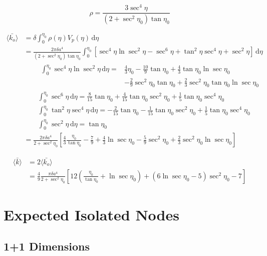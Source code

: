 \documentclass[12pt]{article}
\begin{document}
\begin{equation}
\rho = \frac{3\sec^4\eta}{\left(2+\sec^2\eta_0\right)\tan\eta_0}
\end{equation}

\begin{align}
\langle\bar{k_o}\rangle &= \delta\int_0^{\eta_0}\!\rho\left(\eta\right)V_p\left(\eta\right)\,\mathrm d\eta \\
  &= \frac{2\pi\delta a^4}{\left(2+\sec^2\eta_0\right)\tan\eta_0}\int_0^{\eta_0}\!\left[\sec^4\eta\ln\sec^2\eta - \sec^6\eta + \tan^2\eta\sec^4\eta+\sec^2\eta\right]\,\mathrm d\eta \\
  &\qquad\begin{aligned}
    \int_0^{\eta_0}\!\sec^4\eta\ln\sec^2\eta\,\mathrm d\eta = &\frac{4}{3}\eta_0 - \frac{10}{9}\tan\eta_0 + \frac{4}{3}\tan\eta_0\ln\sec\eta_0 \\
    &-\frac{2}{9}\sec^2\eta_0\tan\eta_0 + \frac{2}{3}\sec^2\eta_0\tan\eta_0\ln\sec\eta_0
  \end{aligned} \\
  &\qquad\int_0^{\eta_0}\!\sec^6\eta\,\mathrm d\eta = \frac{8}{15}\tan\eta_0 + \frac{4}{15}\tan\eta_0\sec^2\eta_0 + \frac{1}{5}\tan\eta_0\sec^4\eta_0 \\
  &\qquad\int_0^{\eta_0}\!\tan^2\eta\sec^4\eta\,\mathrm d\eta = -\frac{2}{15}\tan\eta_0 - \frac{1}{15}\tan\eta_0\sec^2\eta_0 + \frac{1}{5}\tan\eta_0\sec^4\eta_0 \\
  &\qquad\int_0^{\eta_0}\!\sec^2\eta\,\mathrm d\eta = \tan\eta_0 \\
  &=\frac{2\pi\delta a^4}{2+\sec^2\eta_0}\left[\frac{4}{3}\frac{\eta_0}{\tan\eta_0} - \frac{7}{9} + \frac{4}{3}\ln\sec\eta_0 - \frac{5}{9}\sec^2\eta_0 + \frac{2}{3}\sec^2\eta_0\ln\sec\eta_0\right]
\end{align}

\begin{equation}
\begin{split}
\langle\bar{k}\rangle &= 2\langle\bar{k_o}\rangle \\
  &= \frac{4}{9}\frac{\pi\delta a^4}{2+\sec^2\eta_0}\left[12\left(\frac{\eta_0}{\tan\eta_0}+\ln\sec\eta_0\right)+\left(6\ln\sec\eta_0-5\right)\sec^2\eta_0-7\right]
\end{split}
\end{equation}

\section{Expected Isolated Nodes}
\subsection{1+1 Dimensions}
\end{document}
